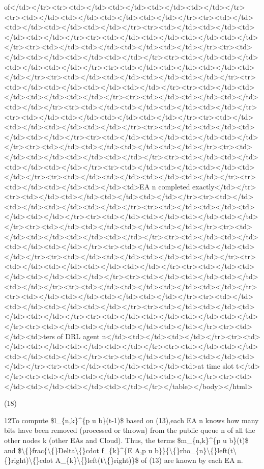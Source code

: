\documentclass{article}
\begin{document}
of</td></tr><tr><td></td><td></td><td></td><td></td></tr><tr><td></td><td></td><td></td><td></td></tr><tr><td></td><td></td><td></td><td></td></tr><tr><td></td><td></td><td></td><td></td></tr><tr><td></td><td></td><td></td><td></td></tr><tr><td></td><td></td><td></td><td></td></tr><tr><td></td><td></td><td></td><td></td></tr><tr><td></td><td></td><td></td><td></td></tr><tr><td></td><td></td><td></td><td></td></tr><tr><td></td><td></td><td></td><td></td></tr><tr><td></td><td></td><td></td><td></td></tr><tr><td></td><td></td><td></td><td></td></tr><tr><td></td><td></td><td></td><td></td></tr><tr><td></td><td></td><td></td><td></td></tr><tr><td></td><td></td><td></td><td></td></tr><tr><td></td><td></td><td></td><td></td></tr><tr><td></td><td></td><td></td><td></td></tr><tr><td></td><td></td><td></td><td></td></tr><tr><td></td><td></td><td></td><td></td></tr><tr><td></td><td></td><td></td><td></td></tr><tr><td></td><td></td><td></td><td></td></tr><tr><td></td><td></td><td></td><td></td></tr><tr><td></td><td></td><td></td><td></td></tr><tr><td></td><td></td><td></td><td>EA n completed exactly</td></tr><tr><td></td><td></td><td></td><td></td></tr><tr><td></td><td></td><td></td><td></td></tr><tr><td></td><td></td><td></td><td></td></tr><tr><td></td><td></td><td></td><td></td></tr><tr><td></td><td></td><td></td><td></td></tr><tr><td></td><td></td><td></td><td></td></tr><tr><td></td><td></td><td></td><td></td></tr><tr><td></td><td></td><td></td><td></td></tr><tr><td></td><td></td><td></td><td></td></tr><tr><td></td><td></td><td></td><td></td></tr><tr><td></td><td></td><td></td><td></td></tr><tr><td></td><td></td><td></td><td></td></tr><tr><td></td><td></td><td></td><td></td></tr><tr><td></td><td></td><td></td><td></td></tr><tr><td></td><td></td><td></td><td></td></tr><tr><td></td><td></td><td></td><td></td></tr><tr><td></td><td></td><td></td><td></td></tr><tr><td></td><td></td><td></td><td></td></tr><tr><td></td><td>ters of DRL agent n</td><td></td><td></td></tr><tr><td></td><td></td><td></td><td></td></tr><tr><td></td><td></td><td></td><td></td></tr><tr><td></td><td></td><td></td><td></td></tr><tr><td></td><td></td><td></td><td>at time slot t</td></tr><tr><td></td><td></td><td></td><td></td></tr><tr><td></td><td></td><td></td><td></td></tr></table></body></html>

(18)

12To compute \$l\_\{n,k\}\textasciicircum{}\{p u b\}(t-1)\$ based on (13),each EA n knows how many bits have been removed (processed or thrown) from the public queue n of all the other nodes k (other EAs and Cloud). Thus, the terms \$m\_\{n,k\}\textasciicircum{}\{p u b\}(t)\$ and \$\textbackslash\{\}frac\{\textbackslash\{\}Delta\textbackslash\{\}cdot f\_\{k\}\textasciicircum{}\{E A,p u b\}\}\{\textbackslash\{\}rho\_\{n\}\textbackslash\{\}left(t\textbackslash\{\}right)\textbackslash\{\}cdot A\_\{k\}\textbackslash\{\}left(t\textbackslash\{\}right)\}\$ of (13) are known by each EA n.
\end{document}
